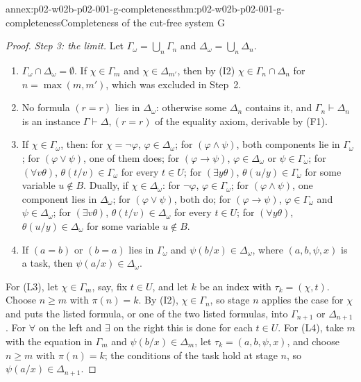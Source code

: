 \begin{annexitem}{annex:p02-w02b-p02-001-g-completeness}{thm:p02-w02b-p02-001-g-completeness}{Completeness of the cut-free system G}
\begin{proof}
\emph{Step 3: the limit.}  Let \(\Gamma_\omega=\bigcup_n\Gamma_n\) and
\(\Delta_\omega=\bigcup_n\Delta_n\).
\begin{enumerate}
\item[(L1)] \(\Gamma_\omega\cap\Delta_\omega=\emptyset\).  If
      \(\chi\in\Gamma_m\) and \(\chi\in\Delta_{m'}\), then by (I2)
      \(\chi\in\Gamma_n\cap\Delta_n\) for \(n=\max(m,m')\), which was
      excluded in Step~2.
\item[(L2)] No formula \((r=r)\) lies in \(\Delta_\omega\): otherwise some
      \(\Delta_n\) contains it, and \(\Gamma_n\vdash\Delta_n\) is an
      instance \(\Gamma\vdash\Delta,(r=r)\) of the equality axiom, derivable
      by (F1).
\item[(L3)] If \(\chi\in\Gamma_\omega\), then: for \(\chi=\neg\varphi\),
      \(\varphi\in\Delta_\omega\); for \((\varphi\land\psi)\), both
      components lie in \(\Gamma_\omega\); for \((\varphi\lor\psi)\), one of
      them does; for \((\varphi\to\psi)\), \(\varphi\in\Delta_\omega\) or
      \(\psi\in\Gamma_\omega\); for \((\forall v\theta)\),
      \(\theta(t/v)\in\Gamma_\omega\) for every \(t\in U\); for
      \((\exists y\theta)\), \(\theta(u/y)\in\Gamma_\omega\) for some
      variable \(u\notin B\).  Dually, if \(\chi\in\Delta_\omega\): for
      \(\neg\varphi\), \(\varphi\in\Gamma_\omega\); for
      \((\varphi\land\psi)\), one component lies in \(\Delta_\omega\); for
      \((\varphi\lor\psi)\), both do; for \((\varphi\to\psi)\),
      \(\varphi\in\Gamma_\omega\) and \(\psi\in\Delta_\omega\); for
      \((\exists v\theta)\), \(\theta(t/v)\in\Delta_\omega\) for every
      \(t\in U\); for \((\forall y\theta)\), \(\theta(u/y)\in\Delta_\omega\)
      for some variable \(u\notin B\).
\item[(L4)] If \((a=b)\) or \((b=a)\) lies in \(\Gamma_\omega\) and
      \(\psi(b/x)\in\Delta_\omega\), where \((a,b,\psi,x)\) is a task, then
      \(\psi(a/x)\in\Delta_\omega\).
\end{enumerate}
For (L3), let \(\chi\in\Gamma_m\), say, fix \(t\in U\), and let \(k\) be
an index with \(\tau_k=(\chi,t)\).  Choose \(n\geq m\) with \(\pi(n)=k\).
By (I2), \(\chi\in\Gamma_n\), so stage \(n\) applies the case for
\(\chi\) and puts the listed formula, or one of the two listed formulas,
into \(\Gamma_{n+1}\) or \(\Delta_{n+1}\).  For \(\forall\) on the left and
\(\exists\) on the right this is done for each \(t\in U\).  For (L4), take
\(m\) with the equation in \(\Gamma_m\) and \(\psi(b/x)\in\Delta_m\), let
\(\tau_k=(a,b,\psi,x)\), and choose \(n\geq m\) with \(\pi(n)=k\); the
conditions of the task hold at stage \(n\), so
\(\psi(a/x)\in\Delta_{n+1}\).


\end{proof}
\end{annexitem}
